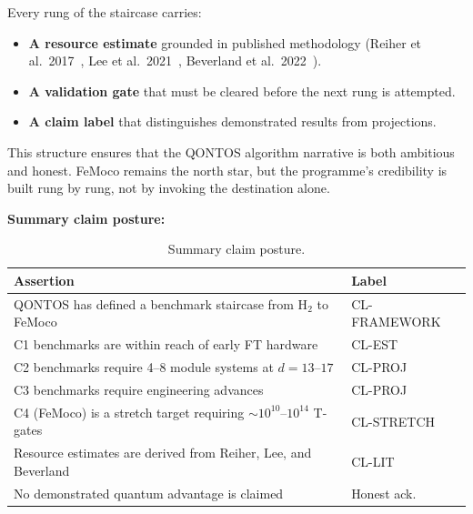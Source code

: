 \documentclass[conference]{IEEEtran}
\begin{document}
Every rung of the staircase carries:

\begin{itemize}[leftmargin=*]
\item \textbf{A resource estimate} grounded in published methodology (Reiher et al.\ 2017~\cite{reiher2017}, Lee
  et al.\ 2021~\cite{lee2021}, Beverland et al.\ 2022~\cite{beverland2022}).
\item \textbf{A validation gate} that must be cleared before the next rung is attempted.
\item \textbf{A claim label} that distinguishes demonstrated results from projections.
\end{itemize}

This structure ensures that the QONTOS algorithm narrative is both ambitious and
honest. FeMoco remains the north star, but the programme's credibility is built
rung by rung, not by invoking the destination alone.

\textbf{Summary claim posture:}

\begin{table}[H]
\centering
\caption{Summary claim posture.}
\begin{tabular}{@{}L{5.5cm} l@{}}
\toprule
\textbf{Assertion} & \textbf{Label} \\
\midrule
QONTOS has defined a benchmark staircase from H$_2$ to FeMoco & CL-FRAMEWORK \\
C1 benchmarks are within reach of early FT hardware & CL-EST \\
C2 benchmarks require 4--8 module systems at $d{=}13$--$17$ & CL-PROJ \\
C3 benchmarks require engineering advances & CL-PROJ \\
C4 (FeMoco) is a stretch target requiring ${\sim}10^{10}$--$10^{14}$ T-gates & CL-STRETCH \\
Resource estimates are derived from Reiher, Lee, and Beverland & CL-LIT \\
No demonstrated quantum advantage is claimed & Honest ack. \\
\bottomrule
\end{tabular}
\end{table}
\end{document}
